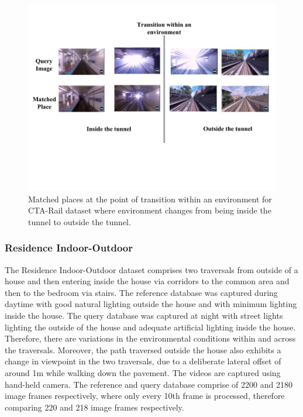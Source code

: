 \documentclass[letterpaper, 10 pt, conference]{ieeeconf}  %
\begin{document}
\begin{figure}
 \includegraphics[clip, trim=0.5cm 8cm 1cm 2.5cm,scale=0.25]{PlaceMatchesAtTransition}
 \caption{Matched places at the point of transition within an environment for CTA-Rail dataset where environment changes from being inside the tunnel to outside the tunnel.}
 \label{fig:placeMatches}
\end{figure}

\subsubsection{Residence Indoor-Outdoor}
The Residence Indoor-Outdoor dataset comprises two traversals from outside of a house and then entering inside the house via corridors to the common area and then to the bedroom via stairs. The reference database was captured during daytime with good natural lighting outside the house and with minimum lighting inside the house. The query database was captured at night with street lights lighting the outside of the house and adequate artificial lighting inside the house. Therefore, there are variations in the environmental conditions within and across the traversals. Moreover, the path traversed outside the house also exhibits a change in viewpoint in the two traversals, due to a deliberate lateral offset of around 1m while walking down the pavement. The videos are captured using hand-held camera. The reference and query database comprise of 2200 and 2180 image frames respectively, where only every 10th frame is processed, therefore comparing 220 and 218 image frames respectively.
\end{document}
